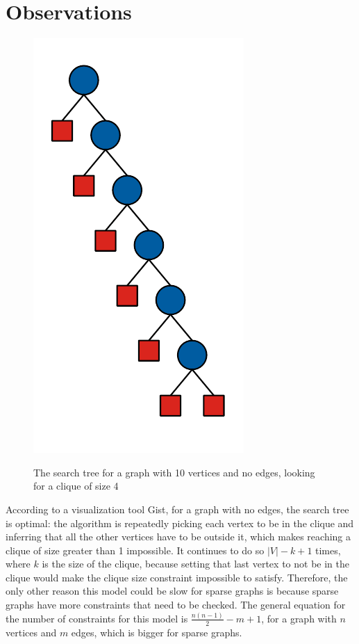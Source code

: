 \documentclass{article}
\begin{document}
\section{Observations}
\begin{figure}
  \includegraphics[scale=0.5]{search_tree.pdf}
  \label{fig:search_tree}
  \caption{The search tree for a graph with 10 vertices and no edges, looking for a clique of size 4}
\end{figure}
According to a visualization tool Gist, for a graph with no edges, the search tree is optimal: the algorithm is repeatedly picking each vertex to be in the clique and inferring that all the other vertices have to be outside it, which makes reaching a clique of size greater than 1 impossible. It continues to do so $|V|-k+1$ times, where $k$ is the size of the clique, because setting that last vertex to not be in the clique would make the clique size constraint impossible to satisfy. Therefore, the only other reason this model could be slow for sparse graphs is because sparse graphs have more constraints that need to be checked. The general equation for the number of constraints for this model is $\frac{n(n-1)}{2}-m+1$, for a graph with $n$ vertices and $m$ edges, which is bigger for sparse graphs.
\end{document}

